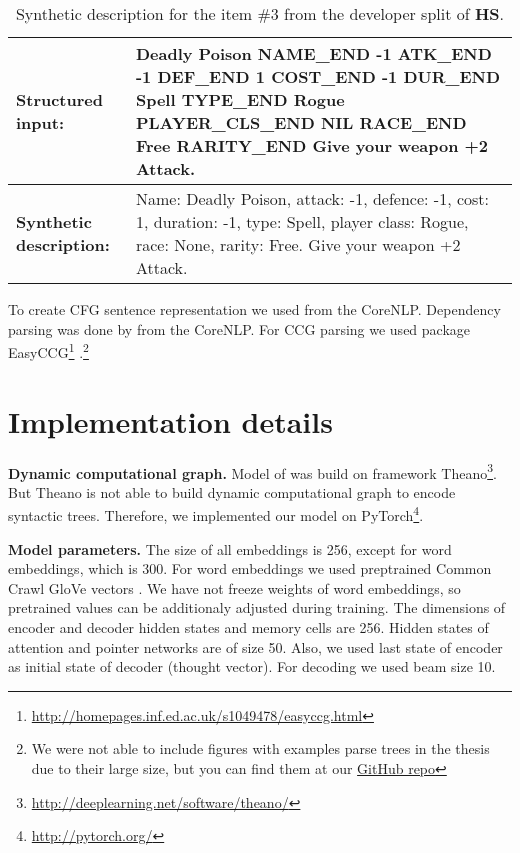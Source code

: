 \begin{table}
\begin{tabularx}{\textwidth}{ l X }
\hline
\textbf{Structured input:} & Deadly Poison NAME\_END -1 ATK\_END -1 DEF\_END 1 COST\_END -1 DUR\_END Spell TYPE\_END Rogue PLAYER\_CLS\_END NIL RACE\_END Free RARITY\_END Give your weapon +2 Attack. \\
\hline 
\textbf{Synthetic description:} & Name: Deadly Poison, attack: -1, defence: -1, cost: 1, duration: -1, type: Spell, player class: Rogue, race: None, rarity: Free. Give your weapon +2 Attack. \\
\hline
\end{tabularx}
\caption[Synthetic description example]{Synthetic description for the item \#3 from the developer split of \textbf{HS}.}
\label{table:hs_input}
\end{table}

To create CFG sentence representation we used  \parencite{klein2003} from the CoreNLP. Dependency parsing was done by  \parencite{chen2014} from the CoreNLP. For CCG parsing we used package EasyCCG\footnote{\href{http://homepages.inf.ed.ac.uk/s1049478/easyccg.html}{http://homepages.inf.ed.ac.uk/s1049478/easyccg.html}} \parencite{lewis2014}.\footnote{We were not able to include figures with examples parse trees in the thesis due to their large size, but you can find them at our \href{https://github.com/tsdaemon/treelstm-code-generation/tree/master/pictures}{GitHub repo}}

\section{Implementation details}

\textbf{Dynamic computational graph.} Model of \cite{Yin2017} was build on framework Theano\footnote{\href{http://deeplearning.net/software/theano/}{http://deeplearning.net/software/theano/}}. But Theano is not able to build dynamic computational graph to encode syntactic trees. Therefore, we implemented our model on PyTorch\footnote{\href{http://pytorch.org/}{http://pytorch.org/}}.

\textbf{Model parameters.} The size of all embeddings is 256, except for word embeddings, which is 300. For word embeddings we used preptrained Common Crawl GloVe vectors \parencite{pennington2014}. We have not freeze weights of word embeddings, so  pretrained values can be additionaly adjusted during training. The dimensions of encoder and decoder hidden states and memory cells are 256. Hidden states of attention and pointer networks are of size 50. Also, we used last state of encoder as initial state of decoder (thought vector). For decoding we used beam size 10.

